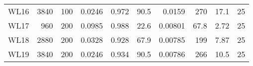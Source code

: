 \begin{tabular}{lrrrrrrrrr}
WL16 &  3840 &  100 &   0.0246 &       0.972 &                    90.5 &  0.0159 &   270 &           17.1 &          25 \\
WL17 &   960 &  200 &   0.0985 &       0.988 &                    22.6 & 0.00801 &  67.8 &           2.72 &          25 \\
WL18 &  2880 &  200 &   0.0328 &       0.928 &                    67.9 & 0.00785 &   199 &           7.87 &          25 \\
WL19 &  3840 &  200 &   0.0246 &       0.934 &                    90.5 & 0.00786 &   266 &           10.5 &          25 \\
\bottomrule
\end{tabular}
